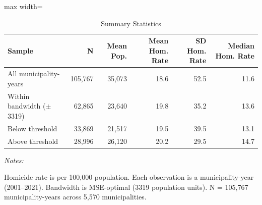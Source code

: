 \begin{table}[!h]
\centering
\caption{\label{tab:summary}Summary Statistics}
\centering
\begin{adjustbox}{max width=\textwidth}
\begin{threeparttable}
\begin{tabular}[t]{lrrrrr}
\toprule
Sample & N & Mean Pop. & Mean Hom. Rate & SD Hom. Rate & Median Hom. Rate\\
\midrule
All municipality-years & 105,767 & 35,073 & 18.6 & 52.5 & 11.6\\
Within bandwidth ($\pm$3319) & 62,865 & 23,640 & 19.8 & 35.2 & 13.6\\
Below threshold & 33,869 & 21,517 & 19.5 & 39.5 & 13.1\\
Above threshold & 28,996 & 26,120 & 20.2 & 29.5 & 14.7\\
\bottomrule
\end{tabular}
\begin{tablenotes}
\item \textit{Notes:} 
\item Homicide rate is per 100,000 population. Each observation is a municipality-year (2001--2021). Bandwidth is MSE-optimal (3319 population units). N = 105,767 municipality-years across 5,570 municipalities.
\end{tablenotes}
\end{threeparttable}
\end{adjustbox}
\end{table}

